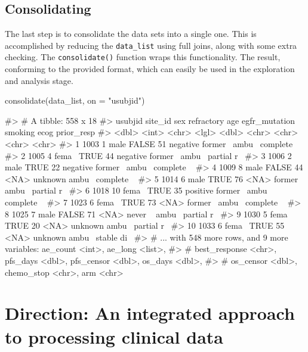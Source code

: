 \hypertarget{consolidating}{%
\subsection{Consolidating}\label{consolidating}}

The last step is to consolidate the data sets into a single one. This is
accomplished by reducing the \texttt{data\_list} using full joins, along
with some extra checking. The \texttt{consolidate()} function wraps this
functionality. The result, conforming to the provided format, which can
easily be used in the exploration and analysis stage.

\begin{Schunk}
\begin{Sinput}
consolidate(data_list, on = "usubjid")
\end{Sinput}
\begin{Soutput}
#> # A tibble: 558 x 18
#>    usubjid site_id sex   refractory   age egfr_mutation smoking ecog  prior_resp
#>      <dbl>   <int> <chr> <lgl>      <dbl> <chr>         <chr>   <chr> <chr>     
#>  1    1003       1 male  FALSE         51 negative      former~ ambu~ complete ~
#>  2    1005       4 fema~ TRUE          44 negative      former~ ambu~ partial r~
#>  3    1006       2 male  TRUE          22 negative      former~ ambu~ complete ~
#>  4    1009       8 male  FALSE         44 <NA>          unknown ambu~ complete ~
#>  5    1014       6 male  TRUE          76 <NA>          former~ ambu~ partial r~
#>  6    1018      10 fema~ TRUE          35 positive      former~ ambu~ complete ~
#>  7    1023       6 fema~ TRUE          73 <NA>          former~ ambu~ complete ~
#>  8    1025       7 male  FALSE         71 <NA>          never ~ ambu~ partial r~
#>  9    1030       5 fema~ TRUE          20 <NA>          unknown ambu~ partial r~
#> 10    1033       6 fema~ TRUE          55 <NA>          unknown ambu~ stable di~
#> # ... with 548 more rows, and 9 more variables: ae_count <int>, ae_long <list>,
#> #   best_response <chr>, pfs_days <dbl>, pfs_censor <dbl>, os_days <dbl>,
#> #   os_censor <dbl>, chemo_stop <chr>, arm <chr>
\end{Soutput}
\end{Schunk}

\hypertarget{direction-an-integrated-approach-to-processing-clinical-data}{%
\section{Direction: An integrated approach to processing clinical
data}\label{direction-an-integrated-approach-to-processing-clinical-data}}

